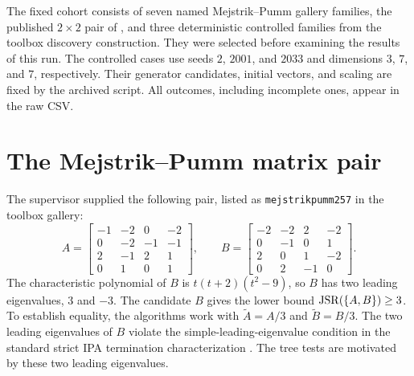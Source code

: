 The fixed cohort consists of seven named Mejstrik--Pumm gallery families, the published $2\times2$ pair of \citet[Example 2.9]{MejstrikReif2025HybridApproachJSR}, and three deterministic controlled families from the toolbox discovery construction.
They were selected before examining the results of this run.
The controlled cases use seeds $2$, $2001$, and $2033$ and dimensions $3$, $7$, and $7$, respectively.
Their generator candidates, initial vectors, and scaling are fixed by the archived script.
All outcomes, including incomplete ones, appear in the raw CSV.

\section{The Mejstrik--Pumm matrix pair}
\label{sec:numericsPrimaryTree}
The supervisor supplied the following pair, listed as \texttt{mejstrikpumm257} in the toolbox gallery:
\[
    A=\begin{bmatrix}
        -1&-2&0&-2 \\
        0&-2&-1&-1 \\
        2&-1&2&1 \\
        0&1&0&1
    \end{bmatrix},\qquad
    B=\begin{bmatrix}
        -2&-2&2&-2 \\
        0&-1&0&1 \\
        2&0&1&-2 \\
        0&2&-1&0
    \end{bmatrix}.
\]
The characteristic polynomial of $B$ is $t(t+2)(t^2-9)$, so $B$ has two leading eigenvalues, $3$ and $-3$.
The candidate $B$ gives the lower bound $\operatorname{JSR}(\{A,B\})\geq3$.
To establish equality, the algorithms work with $\widetilde{A}=A/3$ and $\widetilde{B}=B/3$.
The two leading eigenvalues of $B$ violate the simple-leading-eigenvalue condition in the standard strict IPA termination characterization \citep[Theorem 2.5]{MejstrikReif2025HybridApproachJSR}.
The tree tests are motivated by these two leading eigenvalues.

